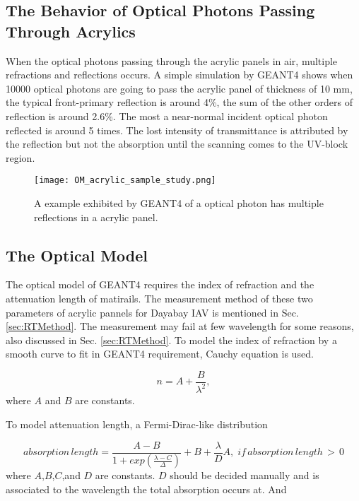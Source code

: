 \subsection {The Behavior of Optical Photons Passing Through Acrylics}

When the optical photons passing through the acrylic panels in air, multiple refractions
and reflections occurs. A simple simulation by GEANT4 shows when 10000 optical photons
are going to pass the acrylic panel of thickness of 10 mm, the typical front-primary
reflection is around 4\%, the sum of the other orders of reflection is around 2.6\%.
The most a near-normal incident optical photon reflected is around 5 times.
The lost intensity of transmittance is attributed by the reflection but not the
absorption until the scanning comes to the UV-block region.


\begin{figure}
    \centering
    \texttt{[image: OM\_acrylic\_sample\_study.png]}
    \caption[A example exhibited by GEANT4 of a optical photon has multiple reflections in a acrylic panel.]
{
A example exhibited by GEANT4 of a optical photon has multiple reflections in a acrylic panel.
}
    \label{fig:OM_acrylic_sample_study.png}
    \end{figure}



\subsection {The Optical Model}
\label{sec:opticalModel}

The optical model of GEANT4 requires the index of refraction and the attenuation length
of matirails. The measurement method of these two parameters of acrylic pannels for Dayabay IAV
is mentioned in Sec. \ref{sec:RTMethod}.
The measurement may fail at few wavelength for some reasons, also discussed
in Sec. \ref{sec:RTMethod}.
To model the index of refraction by a smooth curve to fit in GEANT4 requirement, Cauchy equation
is used.

\begin{equation}
\label{eq:Chauchy}
n = A + \frac{B}{\lambda^2},
\end{equation}
where $A$ and $B$ are constants.


To model attenuation length, a Fermi-Dirac-like distribution


\begin{equation}
\label{eq:AttenuationModelA}
absorption\,length = {\frac{A - B}{1 + exp(\frac{\lambda - C}{\Delta})}} + B + {\frac{\lambda}{D}}A,\;if\,absorption\,length\,>\,0
\end{equation}
where $A$,$B$,$C$,and $D$ are constants. $D$ should be decided manually and is associated to the wavelength the total
absorption occurs at. And


